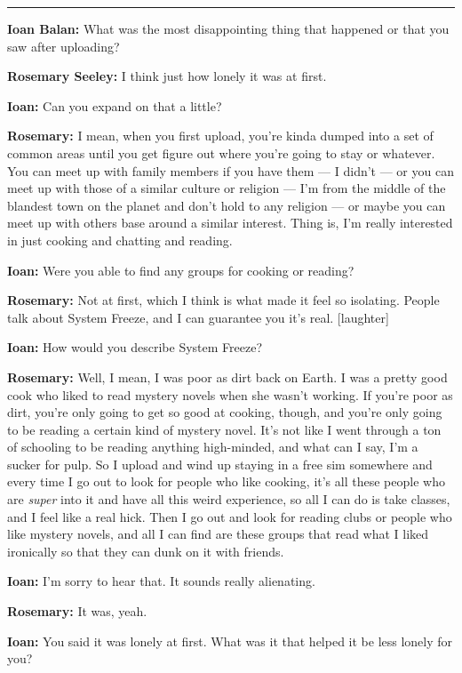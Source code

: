 \begin{center}\rule{0.5\linewidth}{0.5pt}\end{center}

\textbf{Ioan Balan:} What was the most disappointing thing that happened or that you saw after uploading?

\textbf{Rosemary Seeley:} I think just how lonely it was at first.

\textbf{Ioan:} Can you expand on that a little?

\textbf{Rosemary:} I mean, when you first upload, you're kinda dumped into a set of common areas until you get figure out where you're going to stay or whatever. You can meet up with family members if you have them — I didn't — or you can meet up with those of a similar culture or religion — I'm from the middle of the blandest town on the planet and don't hold to any religion — or maybe you can meet up with others base around a similar interest. Thing is, I'm really interested in just cooking and chatting and reading.

\textbf{Ioan:} Were you able to find any groups for cooking or reading?

\textbf{Rosemary:} Not at first, which I think is what made it feel so isolating. People talk about System Freeze, and I can guarantee you it's real. {[}laughter{]}

\textbf{Ioan:} How would you describe System Freeze?

\textbf{Rosemary:} Well, I mean, I was poor as dirt back on Earth. I was a pretty good cook who liked to read mystery novels when she wasn't working. If you're poor as dirt, you're only going to get so good at cooking, though, and you're only going to be reading a certain kind of mystery novel. It's not like I went through a ton of schooling to be reading anything high-minded, and what can I say, I'm a sucker for pulp. So I upload and wind up staying in a free sim somewhere and every time I go out to look for people who like cooking, it's all these people who are \emph{super} into it and have all this weird experience, so all I can do is take classes, and I feel like a real hick. Then I go out and look for reading clubs or people who like mystery novels, and all I can find are these groups that read what I liked ironically so that they can dunk on it with friends.

\textbf{Ioan:} I'm sorry to hear that. It sounds really alienating.

\textbf{Rosemary:} It was, yeah.

\textbf{Ioan:} You said it was lonely at first. What was it that helped it be less lonely for you?

